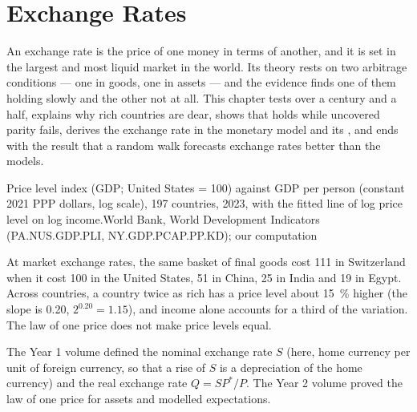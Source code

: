\chapter{Exchange Rates}\label{ch:b3:exchange-rates}

An exchange rate is the price of one money in terms of another, and it is set in the
largest and most liquid market in the world. Its theory rests on two arbitrage
conditions --- one in goods, one in assets --- and the evidence finds one of them
holding slowly and the other not at all. This chapter tests 
over a century and a half, explains why rich countries are dear, shows that
 holds while uncovered parity fails, derives the
exchange rate in the monetary model and its , and ends with the
result that a random walk forecasts exchange rates better than the models.

\begin{openingchart}{Price level index (GDP; United States = 100) against GDP per
person (constant 2021 PPP dollars, log scale), 197 countries, 2023, with the fitted
line of log price level on log income.}{World Bank, World Development Indicators
(PA.NUS.GDP.PLI, NY.GDP.PCAP.PP.KD); our computation}
\end{openingchart}

At market exchange rates, the same basket of final goods cost 111 in Switzerland
when it cost 100 in the United States, 51 in China, 25 in India and 19 in Egypt.
Across countries, a country twice as rich has a price level about 15~\% higher
(the slope is 0.20, $2^{0.20} = 1.15$), and income alone accounts for a third of the
variation. The law of one price does not make price levels equal.

\begin{recall}
The Year 1 volume defined the nominal exchange rate $S$ (here, home currency per
unit of foreign currency, so that a rise of $S$ is a depreciation of the home
currency) and the real exchange rate $Q = SP^*/P$. The Year 2 volume proved the law of
one price for assets and modelled expectations.
\end{recall}


